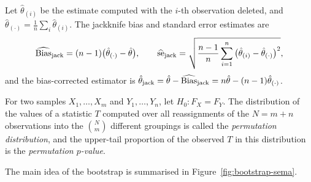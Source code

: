 \documentclass[main.tex]{subfiles}
\begin{document}
\begin{definition}[Jackknife]\label{def:jackknife-tanim}
Let $\hat\theta_{(i)}$ be the estimate computed with the $i$-th observation deleted, and $\hat\theta_{(\cdot)}=\frac1n\sum_i\hat\theta_{(i)}$. The jackknife bias and standard error estimates are
\[
\widehat{\operatorname{Bias}}_{\text{jack}}=(n-1)\big(\hat\theta_{(\cdot)}-\hat\theta\big),\qquad
\widehat{\mathrm{se}}_{\text{jack}}=\sqrt{\frac{n-1}{n}\sum_{i=1}^n\big(\hat\theta_{(i)}-\hat\theta_{(\cdot)}\big)^2},
\]
and the bias-corrected estimator is $\hat\theta_{\text{jack}}=\hat\theta-\widehat{\operatorname{Bias}}_{\text{jack}}=n\hat\theta-(n-1)\hat\theta_{(\cdot)}$.
\end{definition}

\begin{definition}
For two samples $X_1,\dots,X_m$ and $Y_1,\dots,Y_n$, let $H_0:F_X=F_Y$. The distribution of the values of a statistic $T$ computed over all reassignments of the $N=m+n$ observations into the $\binom Nm$ different groupings is called the \emph{permutation distribution}, and the upper-tail proportion of the observed $T$ in this distribution is the \emph{permutation $p$-value}.
\end{definition}

The main idea of the bootstrap is summarised in Figure~\ref{fig:bootstrap-sema}.
\end{document}
